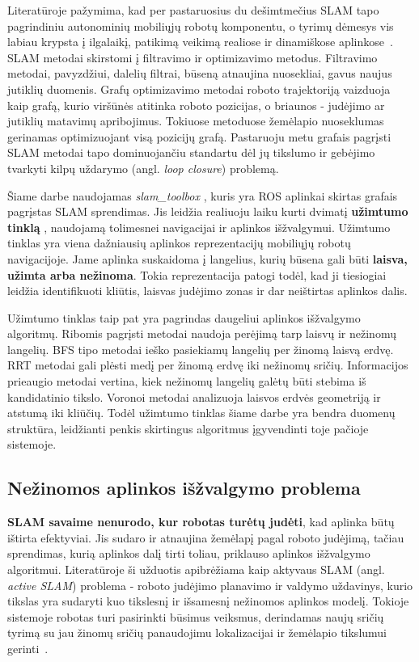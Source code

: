 \documentclass[]{VUMIFTemplateClass}
\begin{document}
Literatūroje pažymima, kad per pastaruosius du dešimtmečius SLAM tapo pagrindiniu autonominių mobiliųjų robotų komponentu, o tyrimų dėmesys vis labiau
krypsta
į ilgalaikį, patikimą veikimą realiose ir dinamiškose aplinkose~\cite{slam-past-present-future}.                                                                                        
SLAM metodai skirstomi į filtravimo ir optimizavimo metodus. Filtravimo metodai, pavyzdžiui, dalelių filtrai, būseną atnaujina nuosekliai, gavus naujus jutiklių
duomenis. Grafų optimizavimo metodai roboto trajektoriją vaizduoja kaip grafą, kurio viršūnės atitinka roboto pozicijas, o briaunos - judėjimo ar jutiklių matavimų apribojimus. Tokiuose metoduose žemėlapio nuoseklumas gerinamas optimizuojant visą pozicijų grafą. Pastaruoju metu grafais pagrįsti SLAM metodai tapo
dominuojančiu           
standartu dėl jų tikslumo ir gebėjimo tvarkyti kilpų uždarymo (angl. \textit{loop closure}) problemą.

Šiame darbe naudojamas \textit{slam\_toolbox} \cite{SLAM-toolbox}, kuris yra ROS aplinkai skirtas grafais pagrįstas SLAM sprendimas. Jis leidžia realiuoju laiku kurti dvimatį
\textbf{užimtumo tinklą}  \cite{Occupancy-grid}, naudojamą tolimesnei navigacijai ir aplinkos išžvalgymui. Užimtumo tinklas yra viena dažniausių aplinkos reprezentacijų mobiliųjų robotų
navigacijoje. Jame aplinka suskaidoma į langelius, kurių būsena gali būti \textbf{laisva, užimta arba nežinoma}. Tokia reprezentacija patogi todėl, kad ji
tiesiogiai leidžia identifikuoti kliūtis, laisvas judėjimo zonas ir dar neištirtas aplinkos dalis.

Užimtumo tinklas taip pat yra pagrindas daugeliui aplinkos išžvalgymo algoritmų. Ribomis pagrįsti metodai naudoja perėjimą tarp laisvų ir nežinomų langelių. BFS
tipo metodai ieško pasiekiamų langelių per žinomą laisvą erdvę. RRT metodai gali plėsti medį per žinomą erdvę iki nežinomų sričių. Informacijos prieaugio
metodai vertina, kiek nežinomų langelių galėtų būti stebima iš kandidatinio tikslo. Voronoi metodai analizuoja laisvos erdvės geometriją ir atstumą iki kliūčių.
Todėl užimtumo tinklas šiame darbe yra bendra duomenų struktūra, leidžianti penkis skirtingus algoritmus įgyvendinti toje pačioje sistemoje.

\subsection{Nežinomos aplinkos išžvalgymo problema}

\textbf{SLAM savaime nenurodo, kur robotas turėtų judėti}, kad aplinka būtų ištirta efektyviai. Jis sudaro ir atnaujina žemėlapį pagal roboto judėjimą, tačiau sprendimas, kurią aplinkos dalį tirti toliau, priklauso aplinkos išžvalgymo algoritmui. Literatūroje ši užduotis apibrėžiama kaip aktyvaus SLAM (angl. \textit{active SLAM}) problema - roboto judėjimo planavimo ir valdymo uždavinys, kurio tikslas yra sudaryti kuo tikslesnį ir išsamesnį nežinomos aplinkos modelį. Tokioje sistemoje
robotas turi pasirinkti būsimus veiksmus, derindamas naujų sričių tyrimą su jau žinomų sričių panaudojimu lokalizacijai ir žemėlapio tikslumui gerinti~\cite{placed2023activeslam}.
                                                                                                                          
\end{document}
